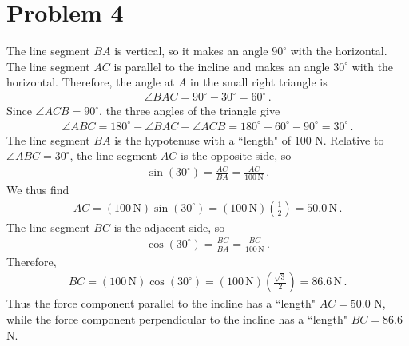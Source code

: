 \documentclass[11pt]{article}
\begin{document}
\section*{Problem 4}
The line segment $BA$ is vertical, so it makes an angle $90^\circ$ with the horizontal. The line segment $AC$ is parallel to the incline and makes an angle $30^\circ$ with the horizontal. Therefore, the angle at $A$ in the small right triangle is
\begin{align*}
\angle BAC=90^\circ-30^\circ=60^\circ\,.
\end{align*}
Since $\angle ACB=90^\circ$, the three angles of the triangle give
\begin{align*}
\angle ABC=180^\circ-\angle BAC-\angle ACB=180^\circ-60^\circ-90^\circ=30^\circ\,.
\end{align*}
The line segment $BA$ is the hypotenuse with a ``length" of $100$ N. Relative to $\angle ABC=30^\circ$, the line segment $AC$ is the opposite side, so
\begin{align*}
\sin(30^\circ)=\frac{AC}{BA}=\frac{AC}{100\,\text{N}}\,.
\end{align*}
We thus find
\begin{align*}
AC=(100\,\text{N})\sin(30^\circ)=(100\,\text{N})\left(\frac{1}{2}\right)=50.0\,\text{N}\,.
\end{align*}
The line segment $BC$ is the adjacent side, so
\begin{align*}
\cos(30^\circ)=\frac{BC}{BA}=\frac{BC}{100\,\text{N}}\,.
\end{align*}
Therefore,
\begin{align*}
BC=(100\,\text{N})\cos(30^\circ)=(100\,\text{N})\left(\frac{\sqrt{3}}{2}\right)=86.6\,\text{N}\,.
\end{align*}
Thus the force component parallel to the incline has a ``length" $AC=50.0$ N, while the force component perpendicular to the incline has a ``length" $BC=86.6$ N.\\
%
\end{document}

